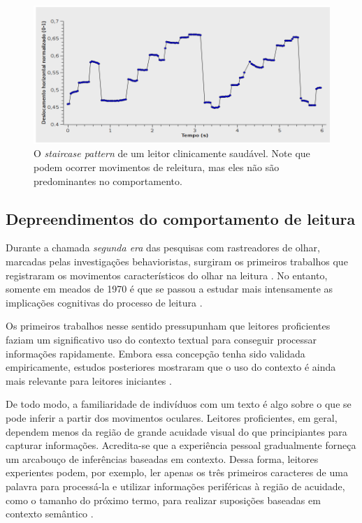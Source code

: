 \documentclass[12pt]{article}
\begin{document}
		\begin{figure}[!ht]
			\centering
			\includegraphics[width=14cm]{imgs/leitura_horizontal1.png}
			\caption{\footnotesize {O \textit{staircase pattern} de um leitor clinicamente saudável. Note que podem ocorrer movimentos de releitura, mas eles não são predominantes no comportamento.}}
			\label{fig:staircase}
			\vspace{5mm}
		\end{figure}
		

		
		\subsection{Depreendimentos do comportamento de leitura}
		Durante a chamada \textit{segunda era} das pesquisas com rastreadores de olhar, marcadas pelas investigações behavioristas, surgiram os primeiros trabalhos que registraram os movimentos característicos do olhar na leitura \cite{Duchowski-2002}. No entanto, somente em meados de 1970 é que se passou a estudar mais intensamente as implicações cognitivas do processo de leitura \cite{Rayner-1998}.
		
		Os primeiros trabalhos nesse sentido pressupunham que leitores proficientes faziam um significativo uso do contexto textual para conseguir processar informações rapidamente. Embora essa concepção tenha sido validada empiricamente, estudos posteriores mostraram que o uso do contexto é ainda mais relevante para leitores iniciantes \cite{Rayner-2001}.
		
		De todo modo, a familiaridade de indivíduos com um texto é algo sobre o que se pode inferir a partir dos movimentos oculares. Leitores proficientes, em geral, dependem menos da região de grande acuidade visual do que principiantes para capturar informações. Acredita-se que a experiência pessoal gradualmente forneça um arcabouço de inferências baseadas em contexto. Dessa forma, leitores experientes podem, por exemplo, ler apenas os três primeiros caracteres de uma palavra para processá-la e utilizar informações periféricas à região de acuidade, como o tamanho do próximo termo, para realizar suposições baseadas em contexto semântico \cite{Rayner-1998, Rayner-2001}.
		
\end{document}
